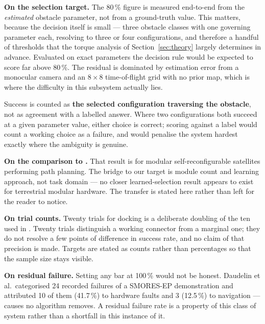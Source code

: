 \documentclass[11pt,a4paper]{article}
\newif\ifreview
\newcommand{\pending}[1]{\ifreview{\color{blue}#1}\else#1\fi}
\newcounter{gsec}
\newcounter{gsub}
\newcommand{\curgsec}{}
\newcommand{\gsep}{\texorpdfstring{\quad}{ }}
\newcommand{\gtocsub}[2]{%
  \phantomsection
  \addcontentsline{toc}{subsection}{#1\gsep #2}%
}
\newcommand{\gsubsection}[1]{%
  \refstepcounter{gsub}%
  \edef\gsublbl{\curgsec.\thegsub}%
  \expandafter\gtocsub\expandafter{\gsublbl}{#1}%
  \subsection*{\gsublbl\quad #1}%
}
\begin{document}
\pending{%
\noindent\textbf{On the selection target.} The 80\,\% figure is measured
end-to-end from the \textit{estimated} obstacle parameter, not from a
ground-truth value. This matters, because the decision itself is small --- three
obstacle classes with one governing parameter each, resolving to three or four
configurations, and therefore a handful of thresholds that the torque analysis
of Section~\ref{sec:theory} largely determines in advance. Evaluated on exact
parameters the decision rule would be expected to score far above 80\,\%. The
residual is dominated by estimation error from a monocular camera and an
$8\times8$ time-of-flight grid with no prior map, which is where the difficulty
in this subsystem actually lies.

\noindent Success is counted as \textbf{the selected configuration traversing
the obstacle}, not as agreement with a labelled answer. Where two
configurations both succeed at a given parameter value, either choice is
correct; scoring against a label would count a working choice as a failure, and
would penalise the system hardest exactly where the ambiguity is genuine.

\noindent\textbf{On the comparison to \cite{liub2025}.} That result is for
modular self-reconfigurable satellites performing path planning. The bridge to
our target is module count and learning approach, not task domain --- no closer
learned-selection result appears to exist for terrestrial modular hardware. The
transfer is stated here rather than left for the reader to notice.

\noindent\textbf{On trial counts.} Twenty trials for docking is a deliberate
doubling of the ten used in \cite{an2026}. Twenty trials distinguish a working
connector from a marginal one; they do not resolve a few points of difference
in success rate, and no claim of that precision is made. Targets are stated as
counts rather than percentages so that the sample size stays visible.

\noindent\textbf{On residual failure.} Setting any bar at 100\,\% would not be
honest. Daudelin et al.\ categorised 24 recorded failures of a SMORES-EP
demonstration and attributed 10 of them (41.7\,\%) to hardware faults and
3 (12.5\,\%) to navigation \cite{daudelin2018} --- causes no algorithm removes.
A residual failure rate is a property of this class of system rather than a
shortfall in this instance of it.
}

\pending{}
\end{document}
